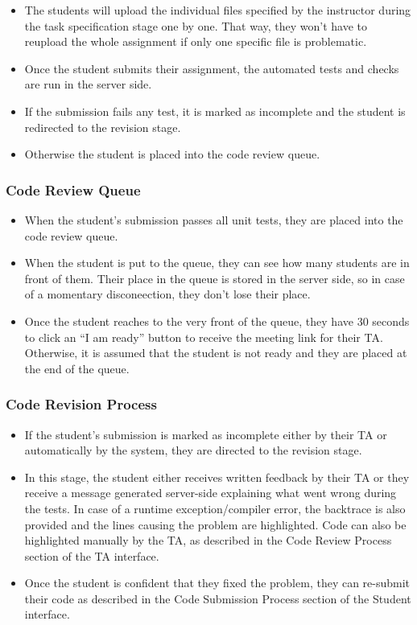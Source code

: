 \documentclass[a4paper, 12pt]{article}
\begin{document}
    \begin{itemize}
      \item The students will upload the individual files specified by the instructor during the task specification
      stage one by one. That way, they won't have to reupload the whole assignment if only one specific file is problematic.
      \item Once the student submits their assignment, the automated tests and checks are run in the server side.
      \item If the submission fails any test, it is marked as incomplete and the student is redirected to the revision stage.
      \item Otherwise the student is placed into the code review queue.
    \end{itemize}

    \subsubsection{Code Review Queue}

    \begin{itemize}

      \item When the student's submission passes all unit tests, they are placed into the code review queue.
      \item When the student is put to the queue, they can see how many students are in front of them. Their place in the queue is
      stored in the server side, so in case of a momentary disconeection, they don't lose their place.
      \item Once the student reaches to the very front of the queue, they have 30 seconds to click an ``I am ready''
      button to receive the meeting link for their TA. Otherwise, it is assumed that the student is not ready and they
      are placed at the end of the queue.
    \end{itemize}

    \subsubsection{Code Revision Process}


    \begin{itemize}
      \item If the student's submission is marked as incomplete either by their TA or automatically by the system, they are directed
      to the revision stage.
      \item In this stage, the student either receives written feedback by their TA or they receive a message generated server-side explaining
      what went wrong during the tests. In case of a runtime exception/compiler error, the backtrace is also provided and the lines causing the
      problem are highlighted. Code can also be highlighted manually by the TA, as described in the Code Review Process section of the TA interface.
      \item Once the student is confident that they fixed the problem, they can re-submit their code as described in the Code Submission Process
      section of the Student interface.
    \end{itemize}
\end{document}
